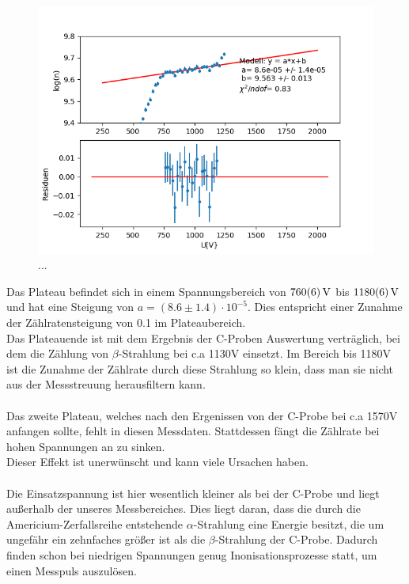 \documentclass[12pt,a4paper]{article}
\begin{document}
\begin{figure}
\centering
\includegraphics[scale=0.8]{Bilder/Prop/Am_plateau.PNG}
\caption{...}
\label{fig:AMPlateau}
\end{figure}

Das Plateau befindet sich in einem Spannungsbereich von $\SI{760\pm 6}{V}$ bis $\SI{1180\pm 6}{V}$ und hat eine Steigung von $a = (8.6\pm1.4)\cdot 10^{-5}$. Dies entspricht einer Zunahme der Zählratensteigung von 0.1 im Plateaubereich.\\ Das Plateauende ist mit dem Ergebnis der C-Proben Auswertung verträglich, bei dem die Zählung von $\beta$-Strahlung bei c.a 1130V einsetzt. Im Bereich bis 1180V ist die Zunahme der Zählrate durch diese Strahlung so klein, dass man sie nicht aus der Messstreuung herausfiltern kann.\\
\\
Das zweite Plateau, welches nach den Ergenissen von der C-Probe bei c.a 1570V anfangen sollte, fehlt in diesen Messdaten. Stattdessen fängt die Zählrate bei hohen Spannungen an zu sinken. \\
Dieser Effekt ist unerwünscht und kann viele Ursachen haben.\\
\\
Die Einsatzspannung ist hier wesentlich kleiner als bei der C-Probe und liegt außerhalb der unseres Messbereiches. Dies liegt daran, dass die durch die Americium-Zerfallsreihe entstehende $\alpha$-Strahlung eine Energie besitzt, die 
um ungefähr ein zehnfaches größer ist als die $\beta$-Strahlung der C-Probe. Dadurch finden schon bei niedrigen Spannungen genug Inonisationsprozesse statt, um einen Messpuls auszulösen.\\
\end{document}
